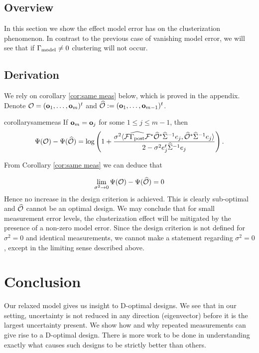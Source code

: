 \documentclass{amsart}
\numberwithin{equation}{section}
\begin{document}
\subsection{Overview}
In this section we show the effect model error has on the
clusterization phenomenon. In contrast to the previous case of
vanishing model error, we will see that if $\Gamma_{\textup{model}} \neq 0$ clustering
will not occur.

\subsection{Derivation}
We rely on corollary \ref{cor:same meas} below, which is proved in the
appendix. Denote $\mathcal{O} = (\mathbf{o}_1,\dots,\mathbf{o}_m)^t$ and $\widehat{\mathcal{O}} :=
(\mathbf{o}_1,\dots,\mathbf{o}_{m-1})^t$.
\begin{restatable*}{corollary}{samemeas}\label{cor:same meas}
  If $\mathbf{o}_m = \mathbf{o}_j$ for some $1 \leq j \leq m-1$, then
  \begin{equation*}
    \Psi(\mathcal{O}) - \Psi(\widehat{\mathcal{O}}) =
    \log \left ( 1 + \frac{\sigma^2
      \langle \mathcal{F} \widehat{\Gamma_{\textup{post}}} \mathcal{F}^* \widehat{\mathcal{O}}^* \widehat{\Sigma}^{-1} e_j,
      \widehat{\mathcal{O}}^* \widehat{\Sigma}^{-1}e_j \rangle
    }{
      2 - \sigma^2 e_j^t\widehat{\Sigma}^{-1}e_j 
    }       
    \right ).
  \end{equation*}
\end{restatable*}
From Corollary \ref{cor:same meas} we can deduce that

$$
\lim_{\sigma^2 \to 0} \Psi(\mathcal{O}) -\Psi(\widehat{\mathcal{O}}) = 0
$$
Hence no increase in the design criterion is
achieved. This is clearly sub-optimal and $\widehat{\mathcal{O}}$ cannot be an optimal
design. We may conclude that for small measurement error levels, the
clusterization effect will be mitigated by the presence of a non-zero
model error. Since the design criterion is not defined for $\sigma^2 =
0$ and identical measurements, we cannot make a statement regarding
$\sigma^2 = 0$, except in the limiting sense described above.

\section{Conclusion}\label{section:conclusion}
Our relaxed model gives us insight to D-optimal designs. We see that
in our setting, uncertainty is not reduced in any direction
(eigenvector) before it is the largest uncertainty present. We show
how and why repeated measurements can give rise to a D-optimal
design. There is more work to be done in understanding exactly what
causes such designs to be strictly better than others.
\end{document}
